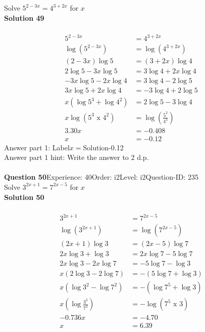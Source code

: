 \documentclass{article}
\begin{document}
Solve $5^{2-3x}=4^{3+2x}$ for $x$\\[4pt]
\noindent\textbf{Solution 49}\\[2pt]
\\[-35pt]\begin{align*}
5^{2-3x}&=4^{3+2x}\\[2pt]
\log(5^{2-3x})&=\log(4^{3+2x})\\[2pt]
(2-3x)\log5&=(3+2x)\log4\\[2pt]
2\log5-3x\log5&=3\log4+2x\log4\\[2pt]
-3x\log5-2x\log4&=3\log4-2\log5\\[2pt]
3x\log5+2x\log4&=-3\log4+2\log5\\[2pt]
x(\log5^3+\log4^2)&=2\log5-3\log4\\[2pt]
x\log{(5^3\,\,\text{x}\,\,4^2)}&=\log\left(\displaystyle\frac{5^2}{4^3}\right)\\[2pt]
3.30x&=-0.408\\[2pt]
x&=-0.12
\end{align*}
Answer part 1: \hspace{10pt}Label\hspace{10pt}$x=$\hspace{10pt}Solution\hspace{10pt}-0.12\\
Answer part 1 hint: \hspace{15pt}Write the answer to 2 d.p.\\
\\[4pt]
\noindent\textbf{Question 50}\hspace{20pt}Experience: 40\hspace{20pt}Order: i2\hspace{20pt}Level: i2\hspace{20pt}Question-ID: 235\\[2pt]
Solve $3^{2x+1}=7^{2x-5}$ for $x$\\[4pt]
\noindent\textbf{Solution 50}\\[2pt]
\\[-35pt]\begin{align*}
3^{2x+1}&=7^{2x-5}\\[2pt]
\log(3^{2x+1})&=\log(7^{2x-5})\\[2pt]
(2x+1)\log3&=(2x-5)\log7\\[2pt]
2x\log3+\log3&=2x\log7-5\log7\\[2pt]
2x\log3-2x\log7&=-5\log7-\log3\\[2pt]
x(2\log3-2\log7)&=-(5\log7+\log3)\\[2pt]
x(\log3^2-\log7^2)&=-(\log7^5+\log3)\\[2pt]
x\left(\log\displaystyle\frac{3^2}{7^2}\right)&=-\log(7^5 \,\, \text{x} \,\, 3)\\[2pt]
-0.736x&=-4.70\\[2pt]
x&=6.39
\end{align*}
\end{document}
